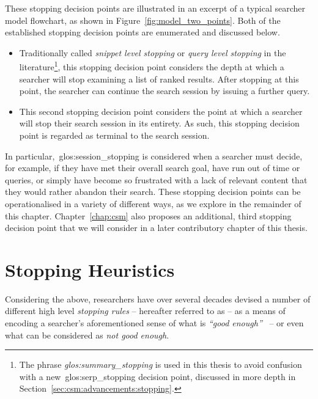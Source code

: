 These stopping decision points are illustrated in an excerpt of a typical searcher model flowchart, as shown in Figure~\ref{fig:model_two_points}. Both of the established stopping decision points are enumerated and discussed below.

\vspace*{-4mm}
\begin{itemize}
    \item[\blueboxbold{1}]{ Traditionally called \emph{snippet level stopping} or \emph{query level stopping} in the literature\footnote{The phrase \emph{\gls{glos:summary_stopping}} is used in this thesis to avoid confusion with a new~\gls{glos:serp_stopping} decision point, discussed in more depth in Section~\ref{sec:csm:advancements:stopping}.}, this stopping decision point considers the depth at which a searcher will stop examining a list of ranked results. After stopping at this point, the searcher can continue the search session by issuing a further query.}
    \item[\blueboxbold{2}]{ This second stopping decision point considers the point at which a searcher will stop their search session in its entirety. As such, this stopping decision point is regarded as terminal to the search session.}
\end{itemize}
\vspace*{-4mm}

In particular,~\gls{glos:session_stopping} is considered when a searcher must decide, for example, if they have met their overall search goal, have run out of time or queries, or simply have become so frustrated with a lack of relevant content that they would rather abandon their search. These stopping decision points can be operationalised in a variety of different ways, as we explore in the remainder of this chapter. Chapter~\ref{chap:csm} also proposes an additional, third stopping decision point that we will consider in a later contributory chapter of this thesis.

\section{Stopping Heuristics}\label{sec:stopping_background:heuristics}
Considering the above, researchers have over several decades devised a number of different high level \emph{stopping rules} -- hereafter referred to as  -- as a means of encoding a searcher's aforementioned sense of what is \emph{``good enough''}~\citep{zach2005enough_is_enough} -- or even what can be considered as \emph{not good enough}.

